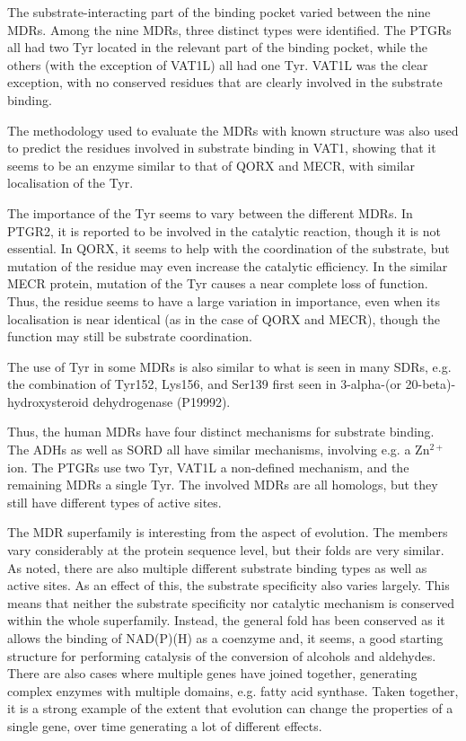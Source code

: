 \documentclass[a4paper, twoside, 12pt, openright]{report}
\begin{document}
The substrate-interacting part of the binding pocket varied between the nine MDRs. Among the nine MDRs, three distinct types were identified. The PTGRs all had two Tyr located in the relevant part of the binding pocket, while the others (with the exception of VAT1L) all had one Tyr. VAT1L was the clear exception, with no conserved residues that are clearly involved in the substrate binding.

The methodology used to evaluate the MDRs with known structure was also used to predict the residues involved in substrate binding in VAT1, showing that it seems to be an enzyme similar to that of QORX and MECR, with similar localisation of the Tyr.

The importance of the Tyr seems to vary between the different MDRs. In PTGR2, it is reported to be involved in the catalytic reaction, though it is not essential\cite{wu_structural_2008}. In QORX, it seems to help with the coordination of the substrate, but mutation of the residue may even increase the catalytic efficiency\cite{porte_three-dimensional_2009}. In the similar MECR protein, mutation of the Tyr causes a near complete loss of function\cite{chen_structural_2008}. Thus, the residue seems to have a large variation in importance, even when its localisation is near identical (as in the case of QORX and MECR), though the function may still be substrate coordination.

The use of Tyr in some MDRs is also similar to what is seen in many SDRs, e.g. the combination of Tyr152, Lys156, and Ser139 first seen in 3-alpha-(or 20-beta)-hydroxysteroid dehydrogenase (P19992)\cite{ghosh_refined_1994}.

Thus, the human MDRs have four distinct mechanisms for substrate binding. The ADHs as well as SORD all have similar mechanisms, involving e.g. a Zn$^{2+}$ ion. The PTGRs use two Tyr, VAT1L a non-defined mechanism, and the remaining MDRs a single Tyr. The involved MDRs are all homologs, but they still have different types of active sites.

The MDR superfamily is interesting from the aspect of evolution. The members vary considerably at the protein sequence level, but their folds are very similar. As noted, there are also multiple different substrate binding types as well as active sites. As an effect of this, the substrate specificity also varies largely. This means that neither the substrate specificity nor catalytic mechanism is conserved within the whole superfamily. Instead, the general fold has been conserved as it allows the binding of NAD(P)(H) as a coenzyme and, it seems, a good starting structure for performing catalysis of the conversion of alcohols and aldehydes. There are also cases where multiple genes have joined together, generating complex enzymes with multiple domains, e.g. fatty acid synthase\cite{jayakumar_human_1995}. Taken together, it is a strong example of the extent that evolution can change the properties of a single gene, over time generating a lot of different effects.
\end{document}
